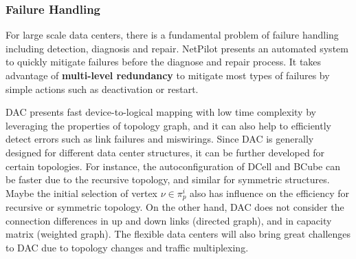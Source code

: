 \documentclass[journal,onecolumn,11pt]{IEEEtran}
\begin{document}
\subsubsection{Failure Handling}

For large scale data centers, there is a fundamental problem of failure handling including detection, diagnosis and repair. NetPilot \cite{Wu:2012:NAD:2342356.2342438} presents an automated system to quickly mitigate failures before the diagnose and repair process. It takes advantage of \textbf{multi-level redundancy} to mitigate most types of failures by simple actions such as deactivation or restart.

DAC \cite{Chen:2010:GAA:1851182.1851190} presents fast device-to-logical mapping with low time complexity by leveraging the properties of topology graph, and it can also help to efficiently detect errors such as link failures and miswirings. Since DAC is generally designed for different data center structures, it can be further developed for certain topologies. For instance, the autoconfiguration of DCell and BCube can be faster due to the recursive topology, and similar for symmetric structures. Maybe the initial selection of vertex $\nu\in\pi_p^i$ also has influence on the efficiency for recursive or symmetric topology. On the other hand, DAC does not consider the connection differences in up and down links (directed graph), and in capacity matrix (weighted graph). The flexible data centers will also bring great challenges to DAC due to topology changes and traffic multiplexing.

\end{document}
